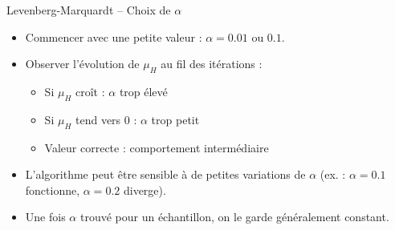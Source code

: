 \documentclass[11pt,aspectratio=169]{beamer}
\begin{document}
\begin{frame}{Levenberg-Marquardt -- Choix de $\alpha$}

\begin{itemize}

\item Commencer avec une petite valeur : $\alpha = 0.01$ ou $0.1$.\newline

\item Observer l'évolution de $\mu_H$ au fil des itérations :
  \begin{itemize}
    \item Si $\mu_H$ croît : $\alpha$ trop élevé\newline
    \item Si $\mu_H$ tend vers 0 : $\alpha$ trop petit\newline
    \item Valeur correcte : comportement intermédiaire\newline
  \end{itemize}

\item L'algorithme peut être sensible à de petites variations de $\alpha$ (ex. : $\alpha = 0.1$ fonctionne, $\alpha = 0.2$ diverge).\newline

\item Une fois $\alpha$ trouvé pour un échantillon, on le garde généralement constant.

\end{itemize}

\end{frame}
\end{document}
